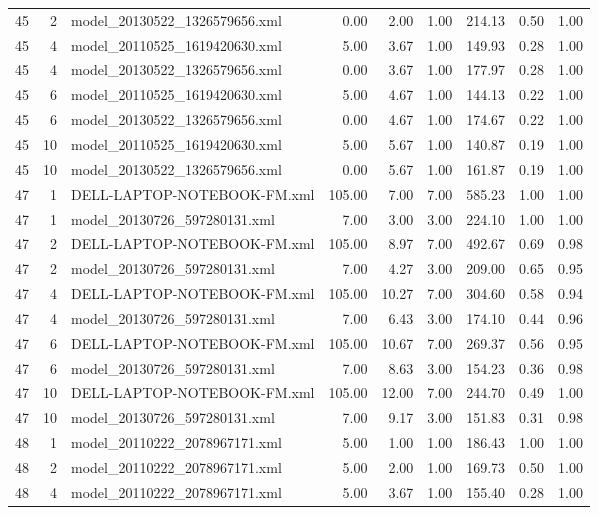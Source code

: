 \begin{table}[ht]
\begin{tabular}{rrlrrrrrr}
   45 &   2 & model\_20130522\_1326579656.xml & 0.00 & 2.00 & 1.00 & 214.13 & 0.50 & 1.00 \\ 
   45 &   4 & model\_20110525\_1619420630.xml & 5.00 & 3.67 & 1.00 & 149.93 & 0.28 & 1.00 \\ 
   45 &   4 & model\_20130522\_1326579656.xml & 0.00 & 3.67 & 1.00 & 177.97 & 0.28 & 1.00 \\ 
   45 &   6 & model\_20110525\_1619420630.xml & 5.00 & 4.67 & 1.00 & 144.13 & 0.22 & 1.00 \\ 
   45 &   6 & model\_20130522\_1326579656.xml & 0.00 & 4.67 & 1.00 & 174.67 & 0.22 & 1.00 \\ 
   45 &  10 & model\_20110525\_1619420630.xml & 5.00 & 5.67 & 1.00 & 140.87 & 0.19 & 1.00 \\ 
   45 &  10 & model\_20130522\_1326579656.xml & 0.00 & 5.67 & 1.00 & 161.87 & 0.19 & 1.00 \\ 
   47 &   1 & DELL-LAPTOP-NOTEBOOK-FM.xml & 105.00 & 7.00 & 7.00 & 585.23 & 1.00 & 1.00 \\ 
   47 &   1 & model\_20130726\_597280131.xml & 7.00 & 3.00 & 3.00 & 224.10 & 1.00 & 1.00 \\ 
   47 &   2 & DELL-LAPTOP-NOTEBOOK-FM.xml & 105.00 & 8.97 & 7.00 & 492.67 & 0.69 & 0.98 \\ 
   47 &   2 & model\_20130726\_597280131.xml & 7.00 & 4.27 & 3.00 & 209.00 & 0.65 & 0.95 \\ 
   47 &   4 & DELL-LAPTOP-NOTEBOOK-FM.xml & 105.00 & 10.27 & 7.00 & 304.60 & 0.58 & 0.94 \\ 
   47 &   4 & model\_20130726\_597280131.xml & 7.00 & 6.43 & 3.00 & 174.10 & 0.44 & 0.96 \\ 
   47 &   6 & DELL-LAPTOP-NOTEBOOK-FM.xml & 105.00 & 10.67 & 7.00 & 269.37 & 0.56 & 0.95 \\ 
   47 &   6 & model\_20130726\_597280131.xml & 7.00 & 8.63 & 3.00 & 154.23 & 0.36 & 0.98 \\ 
   47 &  10 & DELL-LAPTOP-NOTEBOOK-FM.xml & 105.00 & 12.00 & 7.00 & 244.70 & 0.49 & 1.00 \\ 
   47 &  10 & model\_20130726\_597280131.xml & 7.00 & 9.17 & 3.00 & 151.83 & 0.31 & 0.98 \\ 
   48 &   1 & model\_20110222\_2078967171.xml & 5.00 & 1.00 & 1.00 & 186.43 & 1.00 & 1.00 \\ 
   48 &   2 & model\_20110222\_2078967171.xml & 5.00 & 2.00 & 1.00 & 169.73 & 0.50 & 1.00 \\ 
   48 &   4 & model\_20110222\_2078967171.xml & 5.00 & 3.67 & 1.00 & 155.40 & 0.28 & 1.00 \\ 

\end{tabular}
\end{table}
